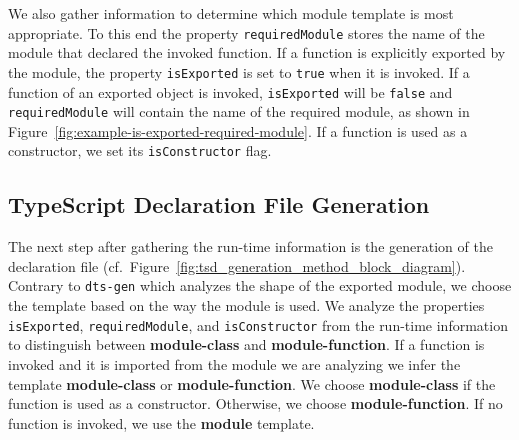 \documentclass[sigplan,screen]{acmart}
\newcommand{\figref}[1]{Figure~\ref{#1}}
\begin{document}
We also gather information to determine which  module template is most
appropriate. To this end
the property \texttt{requiredModule} stores the name of the module that declared the invoked function. If a function is explicitly 
exported by the module, the property \texttt{isExported} is set to \texttt{true} when it is invoked. If a function of an 
exported object is invoked, \texttt{isExported} will be \texttt{false} and \texttt{requiredModule} will contain the name of 
the required module, as shown in
\figref{fig:example-is-exported-required-module}. If a function is
used as a constructor, we set its \texttt{isConstructor} flag.


\subsection{TypeScript Declaration File Generation}
\label{sec:typescr-decl-file}

The next step after gathering the run-time information is
the generation of the declaration file (cf.\
\figref{fig:tsd_generation_method_block_diagram}).
%
Contrary to \texttt{dts-gen} which analyzes the shape of the exported module, we choose the
template based on the way the module is used. We analyze the properties \texttt{isExported},
\texttt{requiredModule}, and \texttt{isConstructor} from the
run-time information to distinguish
between \textbf{module-class} and \textbf{module-function}. If a function is invoked and
it is imported from the module we are analyzing we infer the template
\textbf{module-class} or \textbf{module-function}. We choose \textbf{module-class} if the
function is used as a constructor. Otherwise, we choose
\textbf{module-function}.
If no function is invoked, we use the \textbf{module}
template.
\end{document}
